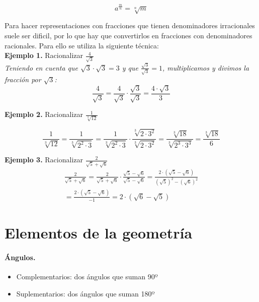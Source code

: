 $$a^{\frac{m}{n}} = \sqrt[n]{m}$$

Para hacer representaciones con fracciones que tienen denominadores irracionales suele ser dificil, por lo que hay que convertirlos en fracciones con denominadores racionales. Para ello se utiliza la siguiente técnica:\\

\textbf{Ejemplo 1.} Racionalizar {\Large $\frac{4}{\sqrt{3}}$}\\
\emph{Teniendo en cuenta que $\sqrt{3} \cdot \sqrt{3} = 3$ y que {\Large $\frac{\sqrt{3}}{\sqrt{3}} = 1$}, multiplicamos y divimos la fracción por $\sqrt{3}$:}
$$\frac{4}{\sqrt{3}} = \frac{4}{\sqrt{3}} \cdot \frac{\sqrt{3}}{\sqrt{3}} = \frac{4 \cdot \sqrt{3}}{3}$$

\textbf{Ejemplo 2.} Racionalizar {\Large $\frac{1}{\sqrt[3]{12}}$}

$$\frac{1}{\sqrt[3]{12}} = \frac{1}{\sqrt[3]{2^2 \cdot 3}} = \frac{1}{\sqrt[3]{2^2 \cdot 3}} \cdot \frac{\sqrt[3]{2 \cdot 3^2}}{\sqrt[3]{2 \cdot 3^2}} = \frac{\sqrt[3]{18}}{\sqrt[3]{2^3 \cdot 3^3}} = \frac{\sqrt[3]{18}}{6}$$

\textbf{Ejemplo 3.} Racionalizar {\Large $\frac{2}{\sqrt{5} + \sqrt{6}}$}
\begin{gather*}
{\frac{2}{\sqrt{5} + \sqrt{6}} = \frac{2}{\sqrt{5} + \sqrt{6}} \cdot \frac{\sqrt{5} - \sqrt{6}}{\sqrt{5} - \sqrt{6}} = \frac{2 \cdot (\sqrt{5} - \sqrt{6})}{(\sqrt{5})^2 - (\sqrt{6})^2}} \\ 
{= \frac{2 \cdot (\sqrt{5} - \sqrt{6})}{-1} = 2 \cdot (\sqrt{6} - \sqrt{5})}
\end{gather*}

\section{Elementos de la geometría}
\paragraph{Ángulos.}
\begin{itemize}
    \item{Complementarios: dos ángulos que suman 90º}
    \item{Suplementarios: dos ángulos que suman 180º}
\end{itemize}

